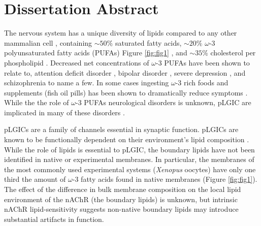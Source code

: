 \documentclass[9pt]{extarticle} %
\begin{document}



\section*{Dissertation Abstract}
The nervous system has a unique diversity of lipids compared to any other mammalian cell \cite{Ingolfsson2014a}, containing $\sim 50\%$ saturated fatty acids, $\sim 20 \%$ $\omega$-3 polyunsaturated fatty acids (PUFAs) Figure \ref{fig:fig1} , and $\sim 35\%$ cholesterol per phospholipid \cite{Taguchi2010,Isolated1969,Breckenridge1973}. Decreased net concentrations of $\omega$-3 PUFAs have been shown to relate to, attention deficit disorder \cite{Manor2011}, bipolar disorder \cite{Koga2019}, severe depression \cite{Su2003}, and schizophrenia \cite{Maekawa2017} to name a few. In some cases ingesting $\omega$-3 rich foods and supplements (fish oil pills) has been shown to dramatically reduce symptoms \cite{DeFelice2012}. While the the role of $\omega$-3 PUFAs  neurological disorders is unknown, pLGIC are implicated in many of these disorders \cite{Xiong2012,Walstab2010,Picciotto_Neuroprotection_2008,MartinRuiz_4_1999,Haydar2010}.

pLGICs are a family of channels essential in synaptic function. pLGICs are known to be functionally dependent on their environment’s lipid composition \cite{Criado1984,Ellena1983,Fong1987,Jones1988,RyanSEDemersCNChewJP1996}. While the role of lipids is essential to pLGIC, the boundary lipids have not been identified in native or experimental membranes. In particular, the membranes of the most commonly used experimental systems (\textit{Xenopus} oocytes) have only one third the amount of $\omega$-3 fatty acids found in native membranes (Figure \ref{fig:fig1}).  The effect of the difference in bulk membrane composition on the local lipid environment of the nAChR (the boundary lipids) is unknown, but intrinsic nAChR lipid-sensitivity suggests non-native boundary lipids may introduce substantial artifacts in function.
\end{document}

